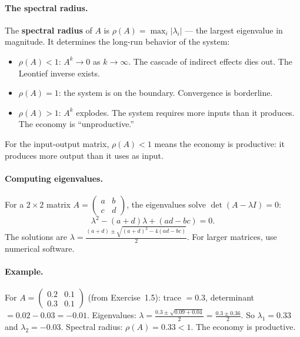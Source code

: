 \documentclass[../structural_economics_book.tex]{subfiles}
\begin{document}
\paragraph{The spectral radius.} The \textbf{spectral radius} of $A$ is $\rho(A) = \max_i |\lambda_i|$ --- the largest eigenvalue in magnitude. It determines the long-run behavior of the system:
\begin{itemize}
\item $\rho(A) < 1$: $A^k \to 0$ as $k \to \infty$. The cascade of indirect effects dies out. The Leontief inverse exists.
\item $\rho(A) = 1$: the system is on the boundary. Convergence is borderline.
\item $\rho(A) > 1$: $A^k$ explodes. The system requires more inputs than it produces. The economy is ``unproductive.''
\end{itemize}

For the input-output matrix, $\rho(A) < 1$ means the economy is productive: it produces more output than it uses as input.

\paragraph{Computing eigenvalues.} For a $2 \times 2$ matrix $A = \begin{pmatrix} a & b \\ c & d \end{pmatrix}$, the eigenvalues solve $\det(A - \lambda I) = 0$:
\begin{equation}
\lambda^2 - (a + d)\lambda + (ad - bc) = 0.
\end{equation}
The solutions are $\lambda = \frac{(a+d) \pm \sqrt{(a+d)^2 - 4(ad-bc)}}{2}$. For larger matrices, use numerical software.

\paragraph{Example.} For $A = \begin{pmatrix} 0.2 & 0.1 \\ 0.3 & 0.1 \end{pmatrix}$ (from Exercise~1.5): trace $= 0.3$, determinant $= 0.02 - 0.03 = -0.01$. Eigenvalues: $\lambda = \frac{0.3 \pm \sqrt{0.09 + 0.04}}{2} = \frac{0.3 \pm 0.36}{2}$. So $\lambda_1 = 0.33$ and $\lambda_2 = -0.03$. Spectral radius: $\rho(A) = 0.33 < 1$. The economy is productive.
\end{document}
